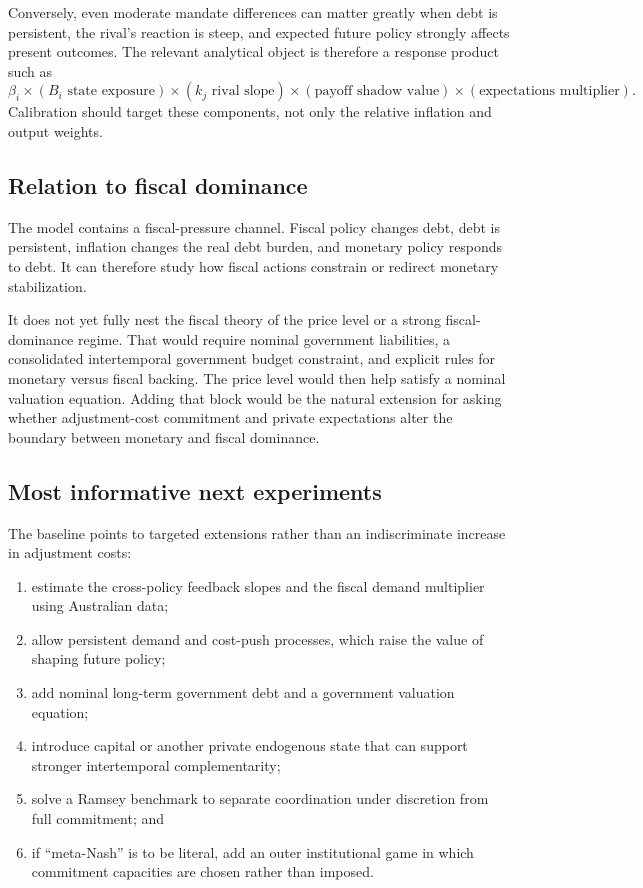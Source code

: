 \documentclass[11pt]{article}
\begin{document}
Conversely, even moderate mandate differences can matter greatly when debt is
persistent, the rival's reaction is steep, and expected future policy strongly
affects present outcomes. The relevant analytical object is therefore a
response product such as
\begin{equation}
\beta_i\times(B_i\text{ state exposure})\times
(k_j\text{ rival slope})\times
(\text{payoff shadow value})\times
(\text{expectations multiplier}).
\end{equation}
Calibration should target these components, not only the relative inflation
and output weights.

\subsection{Relation to fiscal dominance}

The model contains a fiscal-pressure channel. Fiscal policy changes debt, debt
is persistent, inflation changes the real debt burden, and monetary policy
responds to debt. It can therefore study how fiscal actions constrain or
redirect monetary stabilization.

It does not yet fully nest the fiscal theory of the price level or a strong
fiscal-dominance regime. That would require nominal government liabilities, a
consolidated intertemporal government budget constraint, and explicit rules
for monetary versus fiscal backing. The price level would then help satisfy a
nominal valuation equation. Adding that block would be the natural extension
for asking whether adjustment-cost commitment and private expectations alter
the boundary between monetary and fiscal dominance.

\subsection{Most informative next experiments}

The baseline points to targeted extensions rather than an indiscriminate
increase in adjustment costs:

\begin{enumerate}
  \item estimate the cross-policy feedback slopes and the fiscal demand
        multiplier using Australian data;
  \item allow persistent demand and cost-push processes, which raise the value
        of shaping future policy;
  \item add nominal long-term government debt and a government valuation
        equation;
  \item introduce capital or another private endogenous state that can support
        stronger intertemporal complementarity;
  \item solve a Ramsey benchmark to separate coordination under discretion
        from full commitment; and
  \item if ``meta-Nash'' is to be literal, add an outer institutional game in
        which commitment capacities are chosen rather than imposed.
\end{enumerate}
\end{document}
